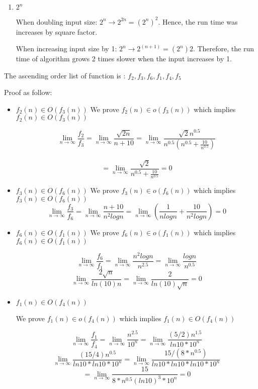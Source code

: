 \documentclass{cpsc413Solutions}
\begin{document}
\begin{problemlist}
\begin{problem}
\begin{answer}
\begin{enumerate}
\item $2^n$

When doubling input size: $2^n \xrightarrow{} 2^{2n} = (2^n)^2$. Hence, the run time was increases by square factor.

When increasing input size by 1: $2^n \xrightarrow{} 2^{(n+1)} = (2^n)2$. 
Therefore, the run time of algorithm grows 2 times slower when the input increases by 1.

\end{enumerate}
\end{answer}
\end{problem}


\begin{problem}
\begin{answer}


The ascending order list of function is : $f_2, f_3, f_6, f_1, f_4, f_5$

Proof as follow:
\begin{itemize}
\item $f_2(n) \in {O}(f_3(n))$
We prove $f_2(n) \in o(f_3(n))$ which implies $f_2(n) \in {O}(f_3(n))$

$$\lim_{n\to\infty}\frac{f_2}{f_3} = \lim_{n\to\infty}\frac{\sqrt{2n}}{n+10} = \lim_{n\to\infty} \frac{\sqrt{2} n^{0.5}}{n^{0.5}(n^{0.5}+\frac{10}{n^{0.5}}) } $$\\
$$= \lim_{n\to\infty} \frac{\sqrt{2}}{n^{0.5}+\frac{10}{n^{0.5}}} = 0$$

\item $f_3(n) \in {O}(f_6(n))$
We prove $f_3(n) \in o(f_6(n))$ which implies $f_3(n) \in {O}(f_6(n))$
$$\lim_{n\to\infty}\frac{f_3}{f_6} = \lim_{n\to\infty}\frac{n+10}{n^2 logn } = \lim_{n\to\infty} (\frac{1}{nlogn} + \frac{10}{n^2logn}) = 0 $$

\item $f_6(n) \in {O}(f_1(n))$
We prove $f_6(n) \in o(f_1(n))$ which implies $f_6(n) \in {O}(f_1(n))$

$$\lim_{n\to\infty}\frac{f_6}{f_1} = \lim_{n\to\infty} \frac{n^2logn}{n^{2.5}} = \lim_{n\to\infty} \frac{logn}{n^{0.5}}$$
$$ \lim_{n\to \infty} \frac{2\sqrt{n}}{ln(10)n} =\lim_{n\to \infty} \frac{2}{ln(10)\sqrt n} = 0$$

\item $f_1(n) \in {O}(f_4(n))$

We prove $f_1(n) \in o(f_4(n))$ which implies $f_1(n) \in {O}(f_4(n))$

$$\lim_{n\to\infty}\frac{f_1}{f_4} = \lim_{n\to\infty} \frac{n^{2.5}}{10^n} = \lim_{n\to\infty} \frac{(5/2) n^{1.5}}{ln10*10^n}$$
$$ \lim_{n\to\infty} \frac{(15/4) n^{0.5}}{ln10*ln10*10^n} = \lim_{n\to\infty} \frac{15/(8*n^{0.5})}{ln10*ln10*ln10*10^n} $$
$$= \lim_{n\to\infty} \frac{15}{8*n^{0.5}(ln10)^3*10^n} = 0$$



\end{itemize}
\end{answer}
\end{problem}
\end{problemlist}
\end{document}
